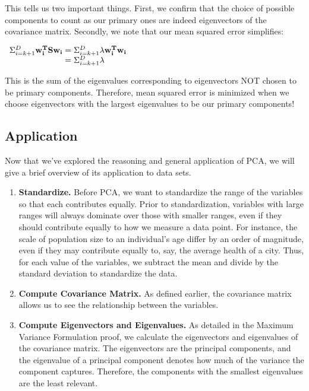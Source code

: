 \documentclass{article}
\begin{document}
\vspace{2mm}
\noindent This tells us two important things. First, we confirm that the choice of possible components to count as our primary ones are indeed eigenvectors of the covariance matrix. Secondly, we note that our mean squared error simplifies:

\begin{center}
    $\begin{array}{l@{{}\mathrel{=}{}}l}
        \Sigma_{i=k+1}^{D}\mathbf{w_{i}^{T}Sw_{i}} & \Sigma_{i=k+1}^{D}\lambda \mathbf{w_{i}^{T}w_{i}}\\
        &\Sigma_{i=k+1}^{D}\lambda
    \end{array}$
\end{center}

\vspace{2mm}
\noindent This is the sum of the eigenvalues corresponding to eigenvectors NOT chosen to be primary components. Therefore, mean squared error is minimized when we choose eigenvectors with the largest eigenvalues to be our primary components!
\subsection{Application}

Now that we've explored the reasoning and general application of PCA, we will give a brief overview of its application to data sets.

\begin{enumerate}
    \item \textbf{Standardize.} Before PCA, we want to standardize the range of the variables so that each contributes equally. Prior to standardization, variables with large ranges will always dominate over those with smaller ranges, even if they should contribute equally to how we measure a data point. For instance, the scale of population size to an individual's age differ by an order of magnitude, even if they may contribute equally to, say, the average health of a city. Thus, for each value of the variables, we subtract the mean and divide by the standard deviation to standardize the data. 

    \item \textbf{Compute Covariance Matrix.} As defined earlier, the covariance matrix allows us to see the relationship between the variables.

    \item \textbf{Compute Eigenvectors and Eigenvalues.} As detailed in the Maximum Variance Formulation proof, we calculate the eigenvectors and eigenvalues of the covariance matrix. The eigenvectors are the principal components, and the eigenvalue of a principal component denotes how much of the variance the component captures. Therefore, the components with the smallest eigenvalues are the least relevant.
\end{enumerate}
\end{document}
